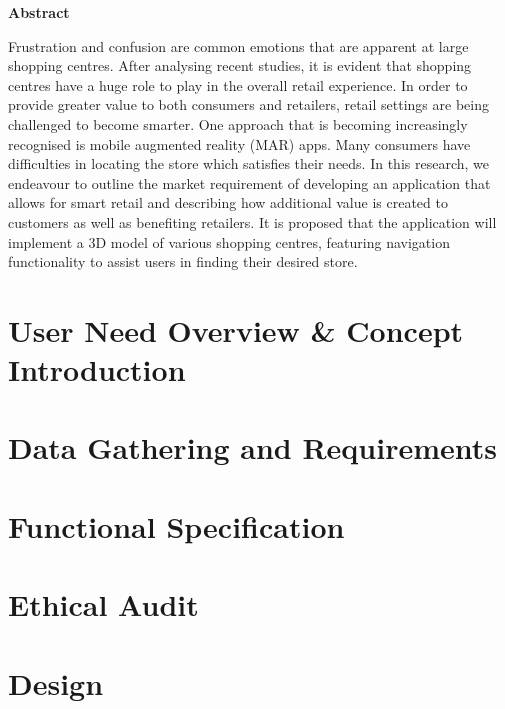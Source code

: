 \documentclass[12pt]{report}
\newcommand\blankpage{%
    \null
    \thispagestyle{empty}%
    \addtocounter{page}{-1}%
    \newpage}
\begin{document}
\begin{center}    
    \large
    \textbf{Abstract}\\
\end{center}
Frustration and confusion are common emotions that are apparent at large shopping centres. After analysing recent studies, it is evident that shopping centres have a huge role to play in the overall retail experience. In order to provide greater value to both consumers and retailers, retail settings are being challenged to become smarter. One approach that is becoming increasingly recognised is mobile augmented reality (MAR) apps. Many consumers have difficulties in locating the store which satisfies their needs. In this research, we endeavour to outline the market requirement of developing an application that allows for smart retail and describing how additional value is created to customers as well as benefiting retailers. It is proposed that the application will implement a 3D model of various shopping centres, featuring navigation functionality to assist users in finding their desired store.\\


\tableofcontents
\afterpage{\blankpage}

\chapter{User Need Overview \& Concept Introduction}


\chapter{Data Gathering and Requirements}


\chapter{Functional Specification}


\chapter{Ethical Audit}


\chapter{Design}

\end{document}
